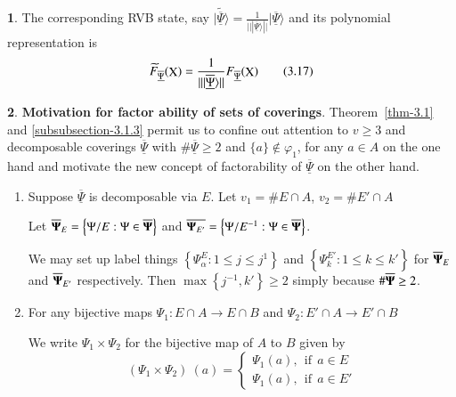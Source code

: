 \documentclass[a4paper,12pt]{article}
\DeclareMathOperator{\x}{\mathrm{X}}
\theoremstyle{definition}
\theoremstyle{underlinethm}
\theoremstyle{definition}
\newtheorem{subsubsec}{}[subsection]
\begin{document}
\begin{subsubsec}
The corresponding RVB state, say $\widetilde{| \underline{\overline{\Psi}} \rangle} = \frac{1}{|| | \underline{\overline{\Psi}} \rangle||} | \underline{\overline{\Psi}} \rangle$ and its polynomial representation is 
\begin{equation*}
\widetilde{F}_{\underline{\overline{\Psi}}} (\bold{\x}) = \frac{1}{|| | \underline{\overline{\Psi}} \rangle||} F_{\underline{\overline{\Psi}}}(\bold{\x})\tag{3.17}
\end{equation*}

\end{subsubsec}

\begin{subsubsec}\label{subsubsection-3.1.5}
{\bf Motivation for factor ability of sets of coverings}. Theorem~\ref{thm-3.1} and \ref{subsubsection-3.1.3} permit us to confine out attention to $v\geq 3$ and decomposable coverings $\underline{\overline{\Psi}}$ with $\# \underline{\overline{\Psi}} \geq 2$ and $\{a\} \notin \varphi_{1}$, for any $a \in A$ on the one hand and motivate the new concept of factorability of $\underline{\overline{\Psi}}$ on the other hand.

\begin{enumerate}[label=(\alph*)]
\item Suppose $\underline{\overline{\Psi}}$ is decomposable via $E$. Let $v_{1}= \# E \cap A$, $v_{2} = \# E' \cap A$

Let $\overline{\bold{\Psi}}_{E} = \left\{ \Psi /E : \Psi \in \overline{\bold{\Psi}}\right\}$ and $\overline{\bold{\Psi}_{E'}} = \left\{\Psi/E^{-1}: \Psi \in \overline{\bold{\Psi}}\right\}$.

We may set up label things $\left\{\Psi_{\alpha}^{E} : 1 \leq j \leq j^{1} \right\}$ and $\left\{\Psi_{k}^{E'} : 1 \leq k \leq k'\right\}$ for $\overline{\bold{\Psi}}_{E}$ and $\overline{\bold{\Psi}}_{E'}$ respectively. Then $\max\left\{j^{-1}, k'\right\} \geq 2$ simply because $\# \overline{\bold{\Psi}} \geq 2$. 

\item For any bijective  maps $\Psi_{1} : E \cap A \longrightarrow E \cap B$ and $\Psi_{2} : E' \cap A \longrightarrow E' \cap B$

We write $\Psi_{1} \times \Psi_{2}$ for the bijective map of $A$ to $B$ given by
\[
(\Psi_{1} \times \Psi_{2})~(a) =  
\begin{cases*}
\Psi_{1}(a),~~ \text{if}~~ a\in E\tag{3.18} \\
\Psi_{1}(a),~~ \text{if}~~a \in E' 
\end{cases*}
\]


\end{enumerate}
\end{subsubsec}
\end{document}
